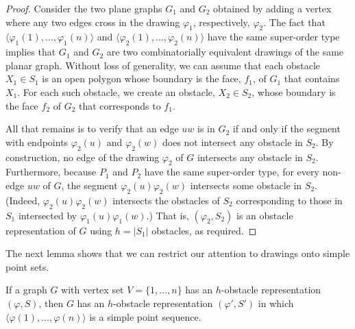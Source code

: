 \documentclass{patmorin}
\renewcommand{\note}[1]{}
\begin{document}
\begin{proof}
  Consider the two plane graphs $G_1$ and $G_2$ obtained by
  adding a vertex where any two edges cross in the drawing
  $\varphi_1$, respectively, $\varphi_2$.  The fact that
  $\langle\varphi_1(1),\ldots,\varphi_1(n)\rangle$ and
  $\langle\varphi_2(1),\ldots,\varphi_2(n)\rangle$ have the same
  super-order type implies that $G_1$ and $G_2$ are two combinatorially
  equivalent drawings of the same planar graph.\note{This claim is the biggest hand-wave of the paper.}  Without loss of
  generality, we can assume that each obstacle $X_1\in S_1$ is an open
  polygon whose boundary is the face, $f_1$, of $G_1$ that contains $X_1$.
  For each such obstacle, we create an obstacle, $X_2\in S_2$, whose boundary
  is the face $f_2$ of $G_2$ that corresponds to $f_1$.  

  All that remains is to verify that an edge $uw$ is in $G_2$ if and
  only if the segment with endpoints $\varphi_2(u)$ and $\varphi_2(w)$
  does not intersect any obstacle in $S_2$.  By construction, no edge
  of the drawing $\varphi_2$ of $G$ intersects any obstacle in $S_2$.
  Furthermore, because $P_1$ and $P_2$ have the same super-order type,
  for every non-edge $uw$ of $G$, the segment $\varphi_2(u)\varphi_2(w)$
  intersects some obstacle in $S_2$.\note{Handwaving indeed, but justification is given in the next sentence.} (Indeed, $\varphi_2(u)\varphi_2(w)$
  intersects the obstacles of $S_2$ corresponding to those in $S_1$
  intersected by $\varphi_1(u)\varphi_1(w)$.)  That is, $(\varphi_2,S_2)$
  is an obstacle representation of $G$ using $h=|S_1|$ obstacles,
  as required.
\end{proof}

The next lemma shows that we can restrict our attention to drawings
onto simple point sets.

\begin{lem}
  If a graph $G$ with vertex set $V=\{1,\ldots,n\}$ has an
  $h$-obstacle representation $(\varphi, S)$, then $G$ has an
  $h$-obstacle representation $(\varphi',S')$ in which $\langle
  \varphi(1),\ldots,\varphi(n)\rangle$ is a simple point sequence.
\end{lem}
\end{document}
